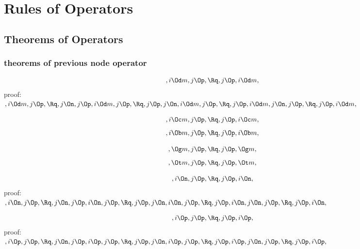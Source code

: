 
 \chapter{Rules of Operators}

\newpage
\section{Theorems of Operators}


\subsection{theorems of previous node operator}

\[,i \Od m, j \Op, \Rq , j \Op, i \Od m,\]
\bigskip
proof:\\
\begin{math} 
,i \Od m, j \Op, \\\\
\Rq, j \On, j \Op, i \Od m, j \Op, \\\\
\Rq, j \Op, j \On, i \Od m, j \Op, \\\\
\Rq, j \Op, i \Od m, j \On, j \Op, \\\\
\Rq, j \Op,i \Od m,
\end{math}
\bigskip

\[,i \Oc m, j \Op, \Rq , j \Op, i \Oc m,\]
\[,i \Ob m, j \Op, \Rq , j \Op, i \Ob m,\]

\[, \Og m, j \Op, \Rq , j \Op,  \Og m,\]
\[, \Ot m, j \Op, \Rq , j \Op,  \Ot m,\]

\[,i \On, j \Op, \Rq , j \Op, i \On,\]
\bigskip
proof:\\
\begin{math} 
,i \On, j \Op, \\\\
\Rq, j \On, j \Op, i \On, j \Op, \\\\
\Rq, j \Op, j \On, i \On, j \Op, \\\\
\Rq, j \Op, i \On, j \On, j \Op, \\\\
\Rq, j \Op, i \On,
\end{math}
\bigskip

\[,i \Op, j \Op, \Rq , j \Op, i \Op,\]
\bigskip
proof:\\
\begin{math} 
,i \Op, j \Op, \\\\
\Rq, j \On, j \Op, i \Op, j \Op, \\\\
\Rq, j \Op, j \On, i \Op, j \Op, \\\\
\Rq, j \Op, i \Op, j \On, j \Op, \\\\
\Rq, j \Op, i \Op,
\end{math}
\bigskip





